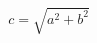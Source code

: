 \documentclass[12pt]{article}
\begin{document}
\begin{displaymath}
c = \sqrt {a^2 + b^2} 
\end{displaymath}
\end{document}
